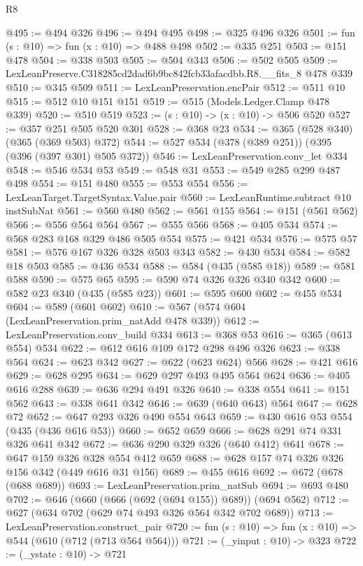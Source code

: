 \begin{lexlean}{R8}
\begin{coremodule}
@495 := @494 @326
@496 := @494 @495
@498 := @325 @496 @326
@501 := fun (s : @10) => fun (x : @10) => @488 @498
@502 := @335 @251
@503 := @151 @478
@504 := @338 @503
@505 := @504 @343
@506 := @502 @505
@509 := LexLeanPreserve.C318285cd2dad6b9bc842fcb33afacdbb.R8.__fits_8 @478 @339
@510 := @345 @509
@511 := LexLeanPreservation.encPair
@512 := @511 @10
@515 := @512 @10 @151 @151
@519 := @515 (Models.Ledger.Clamp @478 @339)
@520 := @510 @519
@523 := (s : @10) -> (x : @10) -> @506 @520
@527 := @357 @251 @505 @520 @301
@528 := @368 @23
@534 := @365 (@528 @340) (@365 (@369 @503) @372)
@544 := @527 @534 (@378 (@389 @251)) (@395 (@396 (@397 @301) @505 @372))
@546 := LexLeanPreservation.conv_let @334
@548 := @546 @534 @53
@549 := @548 @31
@553 := @549 @285 @299 @487 @498
@554 := @151 @480
@555 := @553 @554
@556 := LexLeanTarget.TargetSyntax.Value.pair
@560 := LexLeanRuntime.subtract @10 instSubNat
@561 := @560 @480
@562 := @561 @155
@564 := @151 (@561 @562)
@566 := @556 @564 @564
@567 := @555 @566
@568 := @405 @534
@574 := @568 @283 @168 @329 @486 @505 @554
@575 := @421 @534
@576 := @575 @57
@581 := @576 @167 @326 @328 @503 @343
@582 := @430 @534
@584 := @582 @18 @503
@585 := @436 @534
@588 := @584 (@435 (@585 @18))
@589 := @581 @588
@590 := @575 @65
@595 := @590 @74 @326 @326 @340 @342
@600 := @582 @23 @340 (@435 (@585 @23))
@601 := @595 @600
@602 := @455 @534
@604 := @589 (@601 @602)
@610 := @567 (@574 @604 (LexLeanPreservation.prim_natAdd @478 @339))
@612 := LexLeanPreservation.conv_build @334
@613 := @368 @53
@616 := @365 (@613 @554) @534
@622 := @612 @616 @109 @172 @298 @496 @326
@623 := @338 @564
@624 := @623 @342
@627 := @622 (@623 @624) @566
@628 := @421 @616
@629 := @628 @295
@634 := @629 @297 @493 @495 @564 @624
@636 := @405 @616 @288
@639 := @636 @294 @491 @326
@640 := @338 @554
@641 := @151 @562
@643 := @338 @641 @342
@646 := @639 (@640 @643) @564
@647 := @628 @72
@652 := @647 @293 @326 @490 @554 @643
@659 := @430 @616 @53 @554 (@435 (@436 @616 @53))
@660 := @652 @659
@666 := @628 @291 @74 @331 @326 @641 @342
@672 := @636 @290 @329 @326 (@640 @412) @641
@678 := @647 @159 @326 @328 @554 @412 @659
@688 := @628 @157 @74 @326 @326 @156 @342 (@449 @616 @31 @156)
@689 := @455 @616
@692 := @672 (@678 (@688 @689))
@693 := LexLeanPreservation.prim_natSub
@694 := @693 @480
@702 := @646 (@660 (@666 (@692 (@694 @155)) @689)) (@694 @562)
@712 := @627 (@634 @702 (@629 @74 @493 @326 @564 @342 @702 @689))
@713 := LexLeanPreservation.construct_pair
@720 := fun (s : @10) => fun (x : @10) => @544 (@610 (@712 (@713 @564 @564)))
@721 := (_yinput : @10) -> @323
@722 := (_ystate : @10) -> @721

\end{coremodule}
\end{lexlean}
